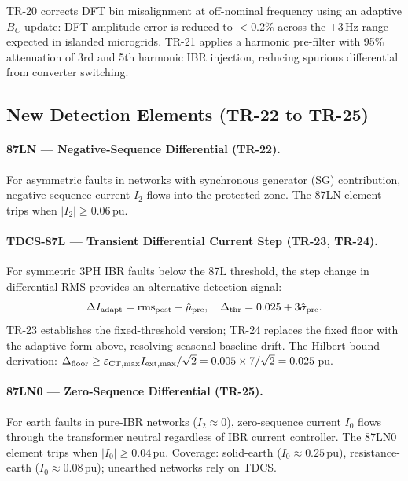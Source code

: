 \documentclass[11pt,a4paper]{article}
\begin{document}
TR-20 corrects DFT bin misalignment at off-nominal frequency using an
adaptive $B_C$ update: DFT amplitude error is reduced to $<$0.2\% across
the $\pm 3$\,Hz range expected in islanded microgrids.  TR-21 applies a
harmonic pre-filter with 95\% attenuation of 3rd and 5th harmonic IBR
injection, reducing spurious differential from converter switching.

\subsection{New Detection Elements (TR-22 to TR-25)}

\paragraph{87LN — Negative-Sequence Differential (TR-22).}
For asymmetric faults in networks with synchronous generator (SG) contribution,
negative-sequence current $I_2$ flows into the protected zone.  The 87LN
element trips when $|I_2| \geq 0.06$\,pu.

\paragraph{TDCS-87L — Transient Differential Current Step (TR-23, TR-24).}
For symmetric 3PH IBR faults below the 87L threshold, the step change in
differential RMS provides an alternative detection signal:
\begin{equation}
  \Delta I_{\rm adapt} = \mathrm{rms}_{\rm post} - \hat{\mu}_{\rm pre},
  \quad
  \Delta_{\rm thr} = 0.025 + 3\hat{\sigma}_{\rm pre}.
\end{equation}
TR-23 establishes the fixed-threshold version; TR-24 replaces the fixed
floor with the adaptive form above, resolving seasonal baseline drift.
The Hilbert bound derivation: $\Delta_{\rm floor} \geq \varepsilon_{\rm CT,max}
I_{\rm ext,max}/\sqrt{2} = 0.005 \times 7/\sqrt{2} = 0.025$\,pu.

\paragraph{87LN0 — Zero-Sequence Differential (TR-25).}
For earth faults in pure-IBR networks ($I_2 \approx 0$), zero-sequence
current $I_0$ flows through the transformer neutral regardless of IBR
current controller.  The 87LN0 element trips when $|I_0| \geq 0.04$\,pu.
Coverage: solid-earth ($I_0 \approx 0.25$\,pu), resistance-earth
($I_0 \approx 0.08$\,pu); unearthed networks rely on TDCS.
\end{document}
